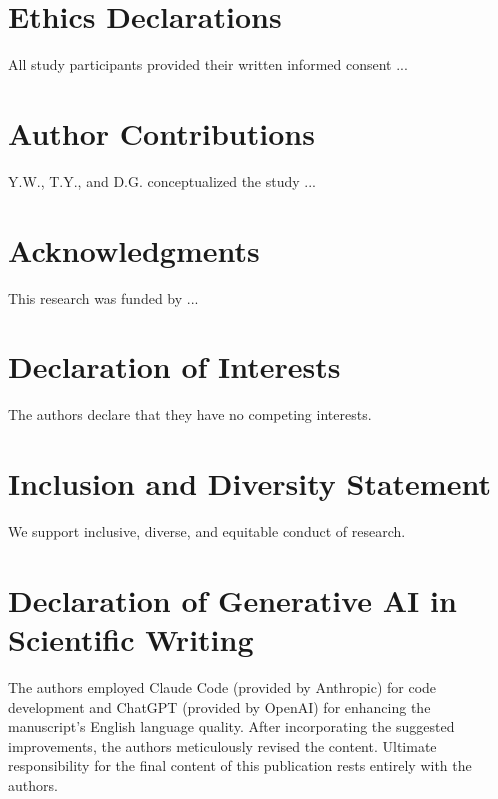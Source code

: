 
\section*{Ethics Declarations}
All study participants provided their written informed consent ...
\label{ethics declarations}

\section*{Author Contributions}
Y.W., T.Y., and D.G. conceptualized the study ...
\label{author contributions}

\section*{Acknowledgments}
This research was funded by ...
\label{acknowledgments}

\section*{Declaration of Interests}
The authors declare that they have no competing interests.
\label{declaration of interests}

\section*{Inclusion and Diversity Statement}
We support inclusive, diverse, and equitable conduct of research.
\label{inclusion and diversity statement}

\section*{Declaration of Generative AI in Scientific Writing}
The authors employed Claude Code (provided by Anthropic) for code development and ChatGPT (provided by OpenAI) for enhancing the manuscript's English language quality. After incorporating the suggested improvements, the authors meticulously revised the content. Ultimate responsibility for the final content of this publication rests entirely with the authors.
\label{declaration of generative ai in scientific writing}


